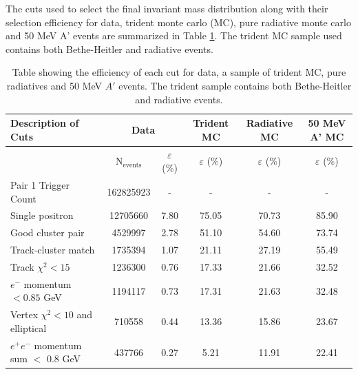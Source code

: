 The cuts used to select the final invariant mass distribution along with their
selection efficiency for data, trident monte carlo (MC), pure radiative 
monte carlo and 50 MeV A' events are summarized in Table \ref{tab:sel_eff}.
The trident MC sample used contains both Bethe-Heitler and radiative events.

\begin{table}
    \centering
    \begin{tabular}{l||c|c|c|c|c}
        \toprule
        \textbf{Description of Cuts} 
        & \multicolumn{2}{c|}{\textbf{Data}}
        & \textbf{Trident MC}
        & \textbf{Radiative MC}
        & \textbf{50 MeV A' MC} \\
        \midrule
        \midrule
        & N$_{\text{events}}$ & $\varepsilon$ (\%)
        & $\varepsilon$ (\%) 
        & $\varepsilon$ (\%)
        & $\varepsilon$ (\%) \\ 
        \midrule
        \midrule
        Pair 1 Trigger Count & 162825923 & -  & - & - & - \\
        Single positron & 12705660 & 7.80  & 75.05 & 70.73 & 85.90 \\
        Good cluster pair & 4529997 & 2.78  & 51.10 & 54.60 & 73.74 \\
        Track-cluster match & 1735394 & 1.07  & 21.11 & 27.19 &55.49 \\
        Track $\chi^2 < 15$ &1236300  & 0.76  &17.33  & 21.66 &32.52  \\
        $e^-$ momentum $ < 0.85$ GeV & 1194117 & 0.73  & 17.31 & 21.63 &32.48  \\
        Vertex $\chi^2 < 10$ and elliptical &710558  & 0.44  &13.36  & 15.86& 23.67 \\
        $e^+e^-$ momentum sum $<$ 0.8 GeV & 437766 & 0.27   & 5.21 & 11.91 &22.41  \\
        \bottomrule
    \end{tabular}
    \caption{Table showing the efficiency of each cut for data, a sample of 
             trident MC, pure radiatives and 50 MeV $A'$ events.  The trident sample
             contains both Bethe-Heitler and radiative events.}
    \label{tab:sel_eff}
\end{table}

